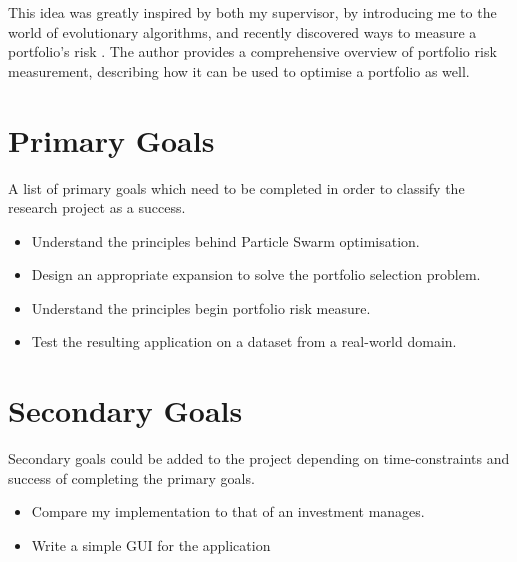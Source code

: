   This idea was greatly inspired by both my supervisor, by introducing me to the world of evolutionary algorithms, and recently discovered ways to measure a portfolio's risk \cite{two_sided_risk}. The author provides a comprehensive overview of portfolio risk measurement, describing how it can be used to optimise a portfolio as well.

  \section{Primary Goals} %
  \label{sec:primary_goals}
  A list of primary goals which need to be completed in order to classify the research project as a success.
  \begin{itemize}
    \item Understand the principles behind Particle Swarm optimisation.
    \item Design an appropriate expansion to solve the portfolio selection problem.
    \item Understand the principles begin portfolio risk measure.
    \item Test the resulting application on a dataset from a real-world domain.
  \end{itemize}

  \section{Secondary Goals} %
  \label{sec:secondary_goals}
  Secondary goals could be added to the project depending on time-constraints and success of completing the primary goals.
  \begin{itemize}
    \item Compare my implementation to that of an investment manages. 
    \item Write a simple GUI for the application
  \end{itemize}
